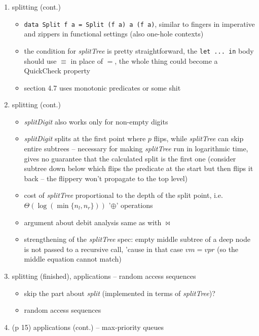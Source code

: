 \documentclass[a4paper]{article}
\begin{document}
\begin{enumerate}[nosep]
\begin{itemize}
		\end{itemize}
	\item splitting (cont.)
		\begin{itemize}
			\item \texttt{data Split f a = Split (f a) a (f a)}, similar to
				fingers in imperative and zippers in functional settings (also
				one-hole contexts)
			\item the condition for \textit{splitTree} is pretty
				straightforward, the \texttt{let ... in} body should use
				$\equiv$ in place of $=$, the whole thing could become a
				QuickCheck property
			\item section 4.7 uses monotonic predicates or some shit
		\end{itemize}
	\item splitting (cont.)
		\begin{itemize}
			\item \textit{splitDigit} also works only for non-empty digits
			\item \textit{splitDigit} splits at the first point where $p$
				flips, while \textit{splitTree} can skip entire subtrees --
				necessary for making \textit{splitTree} run in logarithmic
				time, gives no guarantee that the calculated split is the first
				one (consider subtree down below which flips the predicate at
				the start but then flips it back -- the flippery won't
				propagate to the top level)
			\item cost of \textit{splitTree} proportional to the depth of the
				split point, i.e. $\Theta(\log(\min\{n_l, n_r\}))$ '$\oplus$'
				operations
			\item argument about debit analysis same as with $\bowtie$
			\item strengthening of the \textit{splitTree} spec: empty middle
				subtree of a deep node is not passed to a recursive call,
				'cause in that case $vm = vpr$ (so the middle equation cannot
				match)
		\end{itemize}
	\item splitting (finished), applications -- random access sequences
		\begin{itemize}
			\item skip the part about \textit{split} (implemented in terms of
				\textit{splitTree})?
			\item random access sequences
		\end{itemize}
	\item (p 15) applications (cont.) -- max-priority queues
		\begin{itemize}

\end{itemize}
\end{enumerate}
\end{document}
